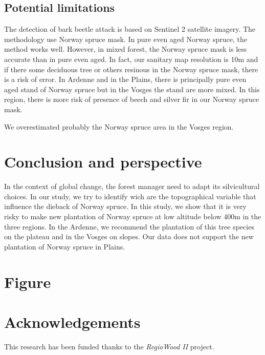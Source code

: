 \documentclass[3p,procedia]{elsarticle}
\begin{document}
\subsection{Potential limitations}
The detection of bark beetle attack is based on Sentinel 2 satellite imagery.
The methodology use Norway spruce mask. 
In pure even aged Norway spruce, the method works well. 
However, in mixed forest, the Norway spruce mask is less accurate than in pure even aged.
In fact, our sanitary map resolution is 10m and if there some deciduous tree or others resinous in the Norway spruce mask, there is a risk of error.
In Ardenne and in the Plains, there is principally pure even aged stand of Norway spruce but in the Vosges the stand are more mixed.
In this region, there is more risk of presence of beech and silver fir in our Norway spruce mask.

We overestimated probably the Norway spruce area in the Vosges region.
\section{Conclusion and perspective}

In the context of global change, the forest manager need to adapt its silvicultural choices.
In our study, we try to identify wich are the topographical variable that influence the dieback of Norway spruce.
In this study, we show that it is very risky to make new plantation of Norway spruce at low altitude below 400m in the three regions.
In the Ardenne, we recommend the plantation of this tree species on the plateau and in the Vosges on slopes. 
Our data does not support the new plantation of Norway spruce in Plains. 
\section{Figure}


	


\section{Acknowledgements}

This research has been funded thanks to the \textit{RegioWood II} project.

%

\end{document}
